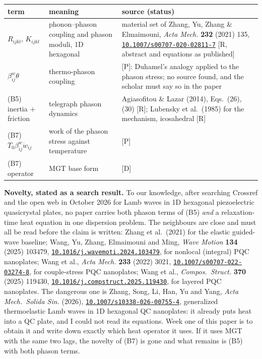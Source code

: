 \documentclass[11pt]{article}
\newcommand{\doi}[1]{\href{https://doi.org/#1}{\texttt{#1}}}
\begin{document}
\begin{center}\footnotesize
\begin{tabular}{p{2.6cm}p{6.0cm}p{5.2cm}}
\toprule
term & meaning & source (status)\\
\midrule
$R_{ijkl}$, $K_{ijkl}$ & phonon--phason coupling and phason moduli, 1D hexagonal & material set of Zhang, Yu, Zhang \& Elmaimouni, \emph{Acta Mech.} \textbf{232} (2021) 135, \doi{10.1007/s00707-020-02811-7} [R, abstract and equations as published]\\
$\beta^{w}_{ij}\theta$ & thermo-phason coupling & [P]: Duhamel's analogy applied to the phason stress; no source found, and the scholar must say so in the paper\\
(B5) inertia $+$ friction & telegraph phason dynamics & Agiasofitou \& Lazar (2014), Eqs.~(26), (30) [R]; Lubensky et al.\ (1985) for the mechanism, icosahedral [R]\\
(B7) $T_0\beta^w_{ij}\dot w_{ij}$ & work of the phason stress against temperature & [P]\\
(B7) operator & MGT base form & [D]\\
\bottomrule
\end{tabular}
\end{center}

\noindent\textbf{Novelty, stated as a search result.} To our knowledge, after searching Crossref and the
open web in October 2026 for Lamb waves in 1D hexagonal piezoelectric quasicrystal plates, no paper
carries both phason terms of (B5) \emph{and} a relaxation-time heat equation in one dispersion problem.
The neighbours are close and must all be read before the claim is written: Zhang et al.\ (2021) for the
elastic guided-wave baseline; Wang, Yu, Zhang, Elmaimouni and Ming, \emph{Wave Motion} \textbf{134} (2025)
103479, \doi{10.1016/j.wavemoti.2024.103479}, for nonlocal (integral) PQC nanoplates; Wang et al.,
\emph{Acta Mech.} \textbf{233} (2022) 3021, \doi{10.1007/s00707-022-03274-8}, for couple-stress PQC
nanoplates; Wang et al., \emph{Compos.\ Struct.} \textbf{370} (2025) 119430,
\doi{10.1016/j.compstruct.2025.119430}, for layered PQC nanoplates. The dangerous one is Zhang, Song, Li,
Han, Yu and Yang, \emph{Acta Mech.\ Solida Sin.} (2026), \doi{10.1007/s10338-026-00755-4}, generalized
thermoelastic Lamb waves in 1D hexagonal QC nanoplates: it already puts heat into a QC plate, and I could
not read its equations. Week one of this paper is to obtain it and write down exactly which heat operator
it uses. If it uses MGT with the same two lags, the novelty of (B7) is gone and what remains is (B5) with
both phason terms.
\end{document}
